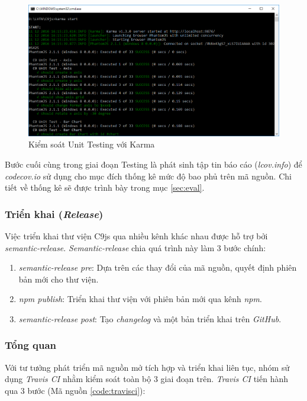 \documentclass[12pt,a4paper,twoside]{article}
\begin{document}
\begin{figure}[!h]
	\begin{center}
    \includegraphics[scale=0.6]{image/karma_1}
    \caption{Kiểm soát Unit Testing với Karma}
    \label{fig:karma_1}
	\end{center}
\end{figure}

Bước cuối cùng trong giai đoạn Testing là phát sinh tập tin báo cáo (\textit{lcov.info}) để \textit{codecov.io} sử dụng cho mục đích thống kê mức độ bao phủ trên mã nguồn. Chi tiết về thống kê sẽ được trình bày trong mục \ref{sec:eval}.

\subsubsection{Triển khai (\textit{Release})}
Việc triển khai thư viện C9js qua nhiều kênh khác nhau được hỗ trợ bởi \textit{semantic-release}. \textit{Semantic-release} chia quá trình này làm 3 bước chính:

\begin{enumerate}
\item \emph{semantic-release pre}: Dựa trên các thay đổi của mã nguồn, quyết định phiên bản mới cho thư viện.
\item \emph{npm publish}: Triển khai thư viện với phiên bản mới qua kênh \textit{npm}.
\item \emph{semantic-release post}: Tạo \textit{changelog} và một bản triển khai trên \textit{GitHub}.
\end{enumerate}

\subsubsection*{Tổng quan}
Với tư tưởng phát triển mã nguồn mở tích hợp và triển khai liên tục, nhóm sử dụng \textit{Travis CI} nhằm kiểm soát toàn bộ 3 giai đoạn trên. \textit{Travis CI} tiến hành qua 3 bước (Mã nguồn \ref{code:travisci}):
\end{document}
